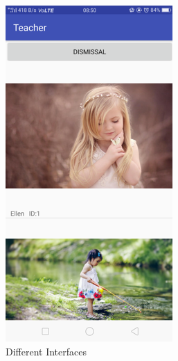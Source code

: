 \documentclass{article}
\begin{document}
\begin{figure}[htbp]
\begin{minipage}[t]{0.30\linewidth}
	\end{minipage}
	\begin{minipage}[t]{0.30\linewidth}
		\includegraphics{img/Picture3}
	\end{minipage}	
	\caption{Different Interfaces}
\end{figure}
\end{document}
